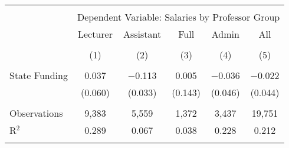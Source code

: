 
\begin{tabular}{@{\extracolsep{5pt}}lccccc} 
\\[-1.8ex]\hline 
\hline \\[-1.8ex] 
 & \multicolumn{5}{c}{Dependent Variable: Salaries by Professor Group} \\ 
\cline{2-6} 
 & Lecturer & Assistant & Full & Admin & All \\ 
\\[-1.8ex] & (1) & (2) & (3) & (4) & (5)\\ 
\hline \\[-1.8ex] 
 State Funding & 0.037 & $-$0.113 & 0.005 & $-$0.036 & $-$0.022 \\ 
  & (0.060) & (0.033) & (0.143) & (0.046) & (0.044) \\ 
 \hline \\[-1.8ex] 
Observations & 9,383 & 5,559 & 1,372 & 3,437 & 19,751 \\ 
R$^{2}$ & 0.289 & 0.067 & 0.038 & 0.228 & 0.212 \\ 
\hline 
\hline \\[-1.8ex] 
\end{tabular} 
